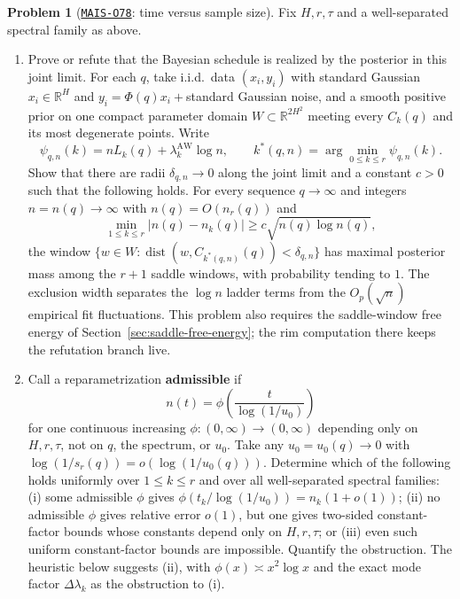 \documentclass[11pt]{amsart}
\newcommand{\Oid}[1]{\href{https://github.com/lionellevine/MAIS/blob/main/open-problems/MAIS-O#1.md}{\texttt{MAIS-O#1}}}
\theoremstyle{plain}
\theoremstyle{definition}
\newtheorem{problem}[theorem]{Problem}
\newcommand{\R}{\mathbb{R}}
\newcommand{\dist}{\operatorname{dist}}
\begin{document}
\begin{problem}[\Oid{78}: time versus sample size]\label{prob:dictionary}
Fix $H,r,\tau$ and a well-separated spectral family as above.
\begin{enumerate}
\item[(a)] Prove or refute that the Bayesian schedule is realized by the posterior in this joint limit. For each $q$, take i.i.d.\ data $(x_i,y_i)$ with standard Gaussian $x_i\in\R^H$ and $y_i=\Phi(q)x_i+{}$standard Gaussian noise, and a smooth positive prior on one compact parameter domain $W\subset\R^{2H^2}$ meeting every $C_k(q)$ and its most degenerate points. Write
\[
   \psi_{q,n}(k)=nL_k(q)+\lambda_k^{\mathrm{AW}}\log n,
   \qquad
   k^*(q,n)=\arg\min_{0\le k\le r}\psi_{q,n}(k).
\]
Show that there are radii $\delta_{q,n}\to0$ along the joint limit and a constant $c>0$ such that the following holds. For every sequence $q\to\infty$ and integers $n=n(q)\to\infty$ with $n(q)=O(n_r(q))$ and
\[
   \min_{1\le k\le r}|n(q)-n_k(q)|
   \ge c\sqrt{n(q)\log n(q)},
\]
the window $\{w\in W:\dist(w,C_{k^*(q,n)}(q))<\delta_{q,n}\}$ has maximal posterior mass among the $r+1$ saddle windows, with probability tending to $1$. The exclusion width separates the $\log n$ ladder terms from the $O_p(\sqrt n)$ empirical fit fluctuations. This problem also requires the saddle-window free energy of Section~\ref{sec:saddle-free-energy}; the rim computation there keeps the refutation branch live.
\item[(b)] Call a reparametrization \textbf{admissible} if
\[
   n(t)=\phi\!\left(\frac{t}{\log(1/u_0)}\right)
\]
for one continuous increasing $\phi\colon(0,\infty)\to(0,\infty)$ depending only on $H,r,\tau$, not on $q$, the spectrum, or $u_0$. Take any $u_0=u_0(q)\to0$ with $\log(1/s_r(q))=o(\log(1/u_0(q)))$. Determine which of the following holds uniformly over $1\le k\le r$ and over all well-separated spectral families: (i) some admissible $\phi$ gives $\phi(t_k/\log(1/u_0))=n_k(1+o(1))$; (ii) no admissible $\phi$ gives relative error $o(1)$, but one gives two-sided constant-factor bounds whose constants depend only on $H,r,\tau$; or (iii) even such uniform constant-factor bounds are impossible. Quantify the obstruction. The heuristic below suggests (ii), with $\phi(x)\asymp x^2\log x$ and the exact mode factor $\Delta\lambda_k$ as the obstruction to (i).
\end{enumerate}
\end{problem}
\end{document}
